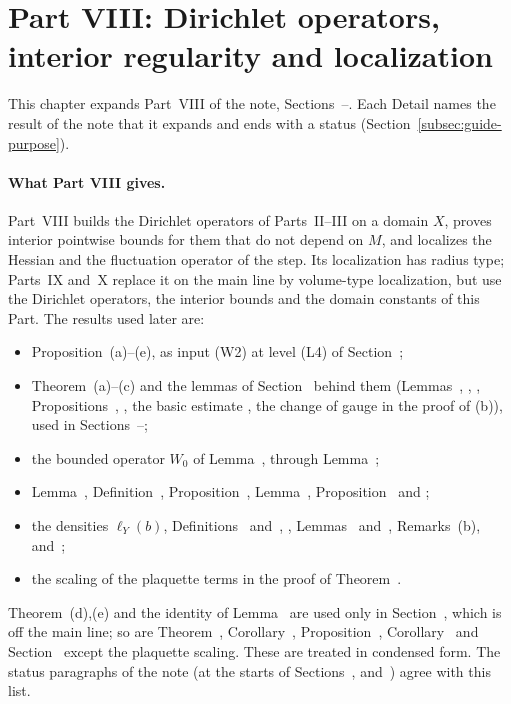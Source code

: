 \section{Part VIII: Dirichlet operators, interior regularity and localization}\label{d8:sec}

This chapter expands Part~VIII of the note, Sections~--. Each Detail names the result of the note that it expands and ends with a status (Section~\ref{subsec:guide-purpose}).

\paragraph{What Part VIII gives.} Part~VIII builds the Dirichlet operators of Parts~II--III on a domain $X$, proves interior pointwise bounds for them that do not depend on $M$, and localizes the Hessian and the fluctuation operator of the step. Its localization has radius type; Parts~IX and~X replace it on the main line by volume-type localization, but use the Dirichlet operators, the interior bounds and the domain constants of this Part. The results used later are:
\begin{itemize}
\item Proposition~(a)--(e), as input (W2) at level (L4) of Section~;
\item Theorem~(a)--(c) and the lemmas of Section~ behind them (Lemmas~, , , Propositions~, , the basic estimate , the change of gauge in the proof of (b)), used in Sections~--;
\item the bounded operator $W_0$ of Lemma~, through Lemma~;
\item Lemma~, Definition~, Proposition~, Lemma~, Proposition~ and ;
\item the densities $\ell_Y(b)$, Definitions~ and~, , Lemmas~ and~, Remarks~(b),  and~;
\item the scaling of the plaquette terms in the proof of Theorem~.
\end{itemize}
Theorem~(d),(e) and the identity of Lemma~ are used only in Section~, which is off the main line; so are Theorem~, Corollary~, Proposition~, Corollary~ and Section~ except the plaquette scaling. These are treated in condensed form. The status paragraphs of the note (at the starts of Sections~,  and~) agree with this list.

